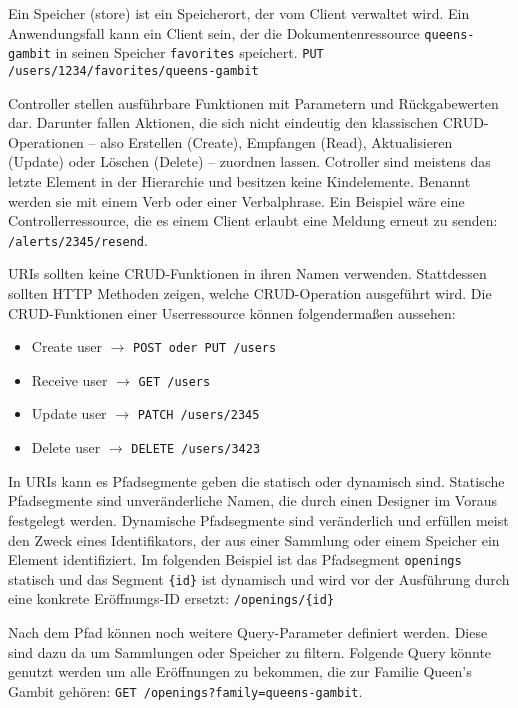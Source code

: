Ein Speicher (store) ist ein Speicherort, der vom Client verwaltet wird. Ein Anwendungsfall kann ein Client sein, der die Dokumentenressource \lstinline{queens-gambit} in seinen Speicher \lstinline{favorites} speichert. \lstinline{PUT /users/1234/favorites/queens-gambit}

Controller stellen ausführbare Funktionen mit Parametern und Rückgabewerten dar.
Darunter fallen Aktionen, die sich nicht eindeutig den klassischen CRUD-Operationen – also Erstellen (Create), Empfangen (Read), Aktualisieren (Update) oder Löschen (Delete) – zuordnen lassen.
Cotroller sind meistens das letzte Element in der Hierarchie und besitzen keine Kindelemente. Benannt werden sie mit einem Verb oder einer Verbalphrase. Ein Beispiel wäre eine Controllerressource, die es einem Client erlaubt eine Meldung erneut zu senden: \lstinline{/alerts/2345/resend}.

\ac{URI}s sollten keine CRUD-Funktionen in ihren Namen verwenden. Stattdessen sollten HTTP Methoden zeigen, welche CRUD-Operation ausgeführt wird. Die CRUD-Funktionen einer Userressource können folgendermaßen aussehen:

\begin{itemize}
  \item Create user $\rightarrow$ \lstinline{POST oder PUT /users}
  \item Receive user $\rightarrow$ \lstinline{GET /users}
  \item Update user $\rightarrow$ \lstinline{PATCH /users/2345}
  \item Delete user $\rightarrow$ \lstinline{DELETE /users/3423}
\end{itemize}

In \ac{URI}s kann es Pfadsegmente geben die statisch oder dynamisch sind. Statische Pfadsegmente sind unveränderliche Namen, die durch einen Designer im Voraus festgelegt werden. Dynamische Pfadsegmente sind veränderlich und erfüllen meist den Zweck eines Identifikators, der aus einer Sammlung oder einem Speicher ein Element identifiziert. Im folgenden Beispiel ist das Pfadsegment \lstinline{openings} statisch und das Segment \lstinline|{id}| ist dynamisch und wird vor der Ausführung durch eine konkrete Eröffnungs-ID ersetzt: \lstinline|/openings/{id}|

Nach dem Pfad können noch weitere Query-Parameter definiert werden. Diese sind dazu da um Sammlungen oder Speicher zu filtern. Folgende Query könnte genutzt werden um alle Eröffnungen zu bekommen, die zur Familie Queen's Gambit gehören: \lstinline{GET /openings?family=queens-gambit}.


